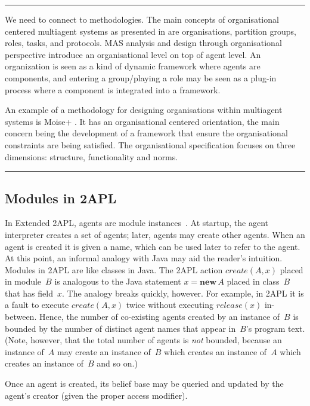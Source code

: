 \documentclass[conference,compsoc]{IEEEtran}
\newenvironment{notes}{\medskip\hrule\nobreak\smallskip\narrower}{\smallskip\hrule\medskip}
\begin{document}
\begin{notes}
We need to connect to methodologies.
The main concepts of organisational centered multiagent systems as
presented in \cite{DBLP:conf/aose/FerberGM03} are organisations, partition
groups, roles, tasks, and protocols. MAS analysis and design through
organisational perspective introduce an organisational level on top of
agent level. An organization is seen as a kind of dynamic framework where
agents are components, and entering a group/playing a role may be seen as a
plug-in process where a component is integrated into a framework.


An example of a methodology for designing organisations within multiagent
systems is Moise+ \cite{}. It has an organisational centered orientation,
the main concern being the development of a framework that ensure the
organisational constraints are being satisfied. The organisational
specification focuses on three dimensions: structure, functionality and
norms. \end{notes}

\subsection{Modules in 2APL}

In Extended 2APL, agents are module
instances~\cite{DBLP:conf/prima/DastaniMS08}. At startup, the agent
interpreter creates a set of agents; later, agents may create other agents.
When an agent is created it is given a name, which can be used later to
refer to the agent. At this point, an informal analogy with Java may aid
the reader's intuition. Modules in 2APL are like classes in Java. The 2APL
action $\mathit{create}(A,x)$ placed in module~$B$ is analogous to the Java
statement $x=\mathbf{new}\,A$ placed in class~$B$ that has field~$x$.  The
analogy breaks quickly, however. For example, in 2APL it is a fault to
execute $\mathit{create}(A,x)$ twice without executing
$\mathit{release}(x)$ in-between. Hence, the number of co-existing agents
created by an instance of~$B$ is bounded by the number of distinct agent
names that appear in~$B$'s program text. (Note, however, that the total
number of agents is \emph{not} bounded, because an instance of~$A$ may
create an instance of~$B$ which creates an instance of~$A$ which creates an
instance of~$B$ and so on.)

Once an agent is created, its belief base may be queried and updated by the
agent's creator (given the proper access modifier).
\end{document}
